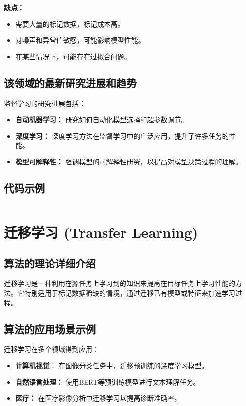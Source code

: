 \textbf{缺点：}
\begin{itemize}
    \item 需要大量的标记数据，标记成本高。
    \item 对噪声和异常值敏感，可能影响模型性能。
    \item 在某些情况下，可能存在过拟合问题。
\end{itemize}

\subsection*{该领域的最新研究进展和趋势}
监督学习的研究进展包括：
\begin{itemize}
    \item \textbf{自动机器学习：} 研究如何自动化模型选择和超参数调节。
    \item \textbf{深度学习：} 深度学习方法在监督学习中的广泛应用，提升了许多任务的性能。
    \item \textbf{模型可解释性：} 强调模型的可解释性研究，以提高对模型决策过程的理解。
\end{itemize}
\subsection*{代码示例}
\begin{lstlisting}

\end{lstlisting}


\section{迁移学习 (Transfer Learning)}
\subsection*{算法的理论详细介绍}
迁移学习是一种利用在源任务上学习到的知识来提高在目标任务上学习性能的方法。它特别适用于标记数据稀缺的情境，通过迁移已有模型或特征来加速学习过程。

\subsection*{算法的应用场景示例}
迁移学习在多个领域得到应用：
\begin{itemize}
    \item \textbf{计算机视觉：} 在图像分类任务中，迁移预训练的深度学习模型。
    \item \textbf{自然语言处理：} 使用BERT等预训练模型进行文本理解任务。
    \item \textbf{医疗：} 在医疗影像分析中迁移学习以提高诊断准确率。
\end{itemize}

